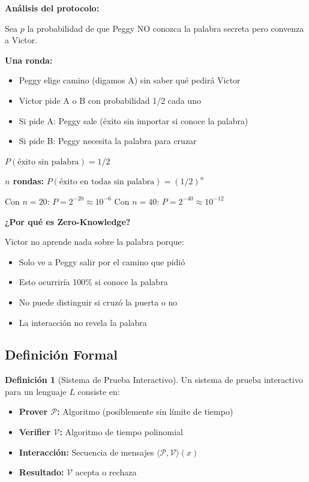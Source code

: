 \documentclass[11pt,a4paper,twoside,openright]{book}
\theoremstyle{definition}
\newtheorem{definition}{Definición}[chapter]
\theoremstyle{plain}
\theoremstyle{remark}
\begin{document}
\begin{mathnote}
\textbf{Análisis del protocolo:}

Sea $p$ la probabilidad de que Peggy NO conozca la palabra secreta pero convenza a Victor.

\textbf{Una ronda:}
\begin{itemize}
    \item Peggy elige camino (digamos A) sin saber qué pedirá Victor
    \item Victor pide A o B con probabilidad 1/2 cada uno
    \item Si pide A: Peggy sale (éxito sin importar si conoce la palabra)
    \item Si pide B: Peggy necesita la palabra para cruzar
\end{itemize}

$P(\text{éxito sin palabra}) = 1/2$

\textbf{$n$ rondas:}
$P(\text{éxito en todas sin palabra}) = (1/2)^n$

Con $n = 20$: $P = 2^{-20} \approx 10^{-6}$
Con $n = 40$: $P = 2^{-40} \approx 10^{-12}$

\textbf{¿Por qué es Zero-Knowledge?}

Victor no aprende nada sobre la palabra porque:
\begin{itemize}
    \item Solo ve a Peggy salir por el camino que pidió
    \item Esto ocurriría 100\% si conoce la palabra
    \item No puede distinguir si cruzó la puerta o no
    \item La interacción no revela la palabra
\end{itemize}
\end{mathnote}

\subsection{Definición Formal}

\begin{definition}[Sistema de Prueba Interactivo]
Un sistema de prueba interactivo para un lenguaje $L$ consiste en:
\begin{itemize}
    \item \textbf{Prover $\mathcal{P}$:} Algoritmo (posiblemente sin límite de tiempo)
    \item \textbf{Verifier $\mathcal{V}$:} Algoritmo de tiempo polinomial
    \item \textbf{Interacción:} Secuencia de mensajes $\langle \mathcal{P}, \mathcal{V} \rangle(x)$
    \item \textbf{Resultado:} $\mathcal{V}$ acepta o rechaza
\end{itemize}
\end{definition}
\end{document}
